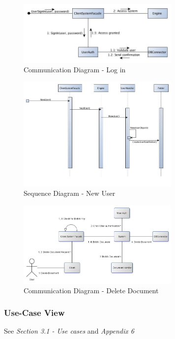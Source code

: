 \documentclass[11pt]{article}
\begin{document}
\begin{figure}[H]
  		\centering
    	\includegraphics[width=300px]{images/SAD/CommunicationDiagram_LogIn.jpg}
    	\caption{Communication Diagram - Log in}
\end{figure}

\begin{figure}[H]
  		\centering
    	\includegraphics[width=300px]{images/SAD/SSQ_NewUser.jpg}
    	\caption{Sequence Diagram - New User}
\end{figure}

\begin{figure}[H]
  		\centering
    	\includegraphics[width=300px]{images/CommunicationDiagrams/Delete Communication Diagram.jpg}
    	\caption{Communication Diagram - Delete Document}
\end{figure}

\subsubsection{Use-Case View}
\label{sec-4-1-7}

See \emph{Section 3.1 - Use cases} and \emph{Appendix 6}
\end{document}
